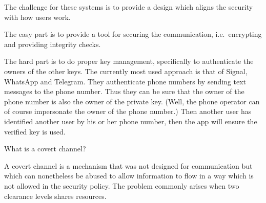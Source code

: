   \begin{solution}
    The challenge for these systems is to provide a design which aligns the 
    security with how users work.

    The easy part is to provide a tool for securing the communication, i.e.\ 
    encrypting and providing integrity checks.

    The hard part is to do proper key management, specifically to authenticate 
    the owners of the other keys.
    The currently most used approach is that of Signal, WhatsApp and Telegram.
    They authenticate phone numbers by sending text messages to the phone 
    number.
    Thus they can be sure that the owner of the phone number is also the owner 
    of the private key.
    (Well, the phone operator can of course impersonate the owner of the phone 
    number.)
    Then another user has identified another user by his or her phone number, 
    then the app will ensure the verified key is used.
  \end{solution}

\question[3]\label{q:sidechannels}
What is a covert channel?

\begin{solution}
  A covert channel is a mechanism that was not designed for communication but 
  which can nonetheless be abused to allow information to flow in a way which 
  is not allowed in the security policy.
  The problem commonly arises when two clearance levels shares resources.
\end{solution}


